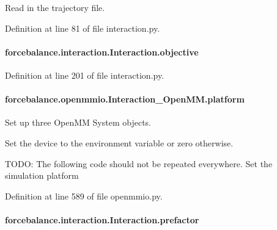 Read in the trajectory file. 



Definition at line 81 of file interaction.\-py.

\hypertarget{classforcebalance_1_1interaction_1_1Interaction_ad25168cac2752545c55fc7e9206d9d29}{
\paragraph[{objective}]{\setlength{\rightskip}{0pt plus 5cm}forcebalance.\-interaction.\-Interaction.\-objective\hspace{0.3cm}{\ttfamily [inherited]}}}\label{classforcebalance_1_1interaction_1_1Interaction_ad25168cac2752545c55fc7e9206d9d29}


Definition at line 201 of file interaction.\-py.

\hypertarget{classforcebalance_1_1openmmio_1_1Interaction__OpenMM_a2cb5810aea0daabf203c7f343954c161}{
\paragraph[{platform}]{\setlength{\rightskip}{0pt plus 5cm}forcebalance.\-openmmio.\-Interaction\-\_\-\-Open\-M\-M.\-platform}}\label{classforcebalance_1_1openmmio_1_1Interaction__OpenMM_a2cb5810aea0daabf203c7f343954c161}


Set up three Open\-M\-M System objects. 

Set the device to the environment variable or zero otherwise.

T\-O\-D\-O\-: The following code should not be repeated everywhere. Set the simulation platform 

Definition at line 589 of file openmmio.\-py.

\hypertarget{classforcebalance_1_1interaction_1_1Interaction_ad4e78437713a0b9b809e4ba52cbbf9d2}{
\paragraph[{prefactor}]{\setlength{\rightskip}{0pt plus 5cm}forcebalance.\-interaction.\-Interaction.\-prefactor\hspace{0.3cm}{\ttfamily [inherited]}}}\label{classforcebalance_1_1interaction_1_1Interaction_ad4e78437713a0b9b809e4ba52cbbf9d2}


